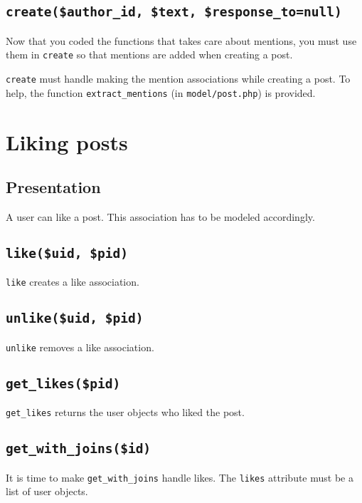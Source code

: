 \documentclass[twoside,a4paper,12pt]{article}
\begin{document}
\subsection{\texttt{create(\$author\_id, \$text, \$response\_to=null)}}
Now that you coded the functions that takes care about mentions, you must use them in \texttt{create} so that mentions are added when creating a post.

\texttt{create} must handle making the mention associations while creating a post. To help, the function \texttt{extract\_mentions} (in \texttt{model/post.php}) is provided.

\section{Liking posts}

\subsection{Presentation}
A user can like a post. This association has to be modeled accordingly.

\subsection{\texttt{like(\$uid, \$pid)}}
\texttt{like} creates a like association.

\subsection{\texttt{unlike(\$uid, \$pid)}}
\texttt{unlike} removes a like association.

\subsection{\texttt{get\_likes(\$pid)}}
\texttt{get\_likes} returns the user objects who liked the post.

\subsection{\texttt{get\_with\_joins(\$id)}}
It is time to make \texttt{get\_with\_joins} handle likes. The \texttt{likes} attribute must be a list of user objects.
\end{document}
